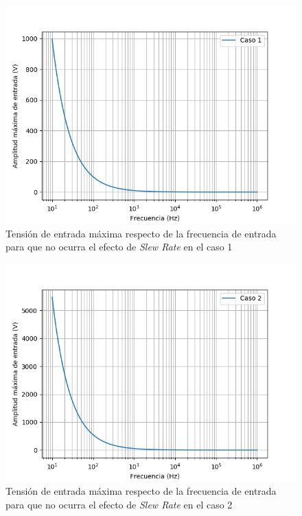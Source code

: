 \begin{figure}[H]
\begin{centering}
\includegraphics[scale=0.5]{../Ex1/iB/Resources1b/slewRate1}
\par\end{centering}
\centering{}\caption{Tensión de entrada máxima respecto de la frecuencia de entrada para
que no ocurra el efecto de \emph{Slew Rate} en el caso 1}
\label{1_b_23}
\end{figure}

\begin{figure}[H]
\begin{centering}
\includegraphics[scale=0.5]{../Ex1/iB/Resources1b/slewRate2}
\par\end{centering}
\centering{}\caption{Tensión de entrada máxima respecto de la frecuencia de entrada para
que no ocurra el efecto de \emph{Slew Rate} en el caso 2}
\label{1_b_24}
\end{figure}

